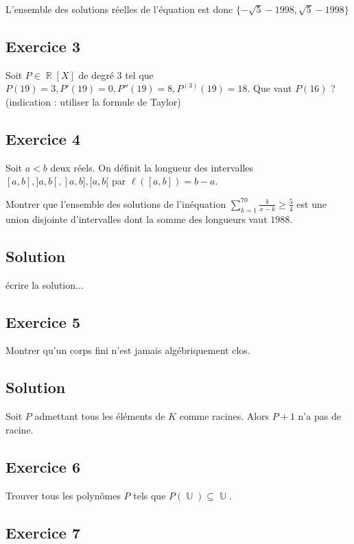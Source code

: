 \documentclass{article}
\DeclareMathOperator{\R}{\mathbb{R}}
\DeclareMathOperator{\U}{\mathbb{U}}
\begin{document}
L'ensemble des solutions réelles de l'équation est donc $\{ -\sqrt{5} - 1998, \sqrt{5}-1998 \}$ 

\subsection*{Exercice 3} 

Soit $P \in \R[X]$ de degré $3$ tel que $P(19) = 3, P'(19) = 0, P''(19) = 8, P^{(3)}(19) = 18$. Que vaut $P(16)$ ? (indication : utiliser la formule de Taylor) 

\subsection*{Exercice 4} 

Soit $a < b$ deux réels. On définit la longueur des intervalles $[a, b], ]a,b[, ]a, b], [a, b[$ par $\ell([a, b]) = b-a$. 

Montrer que l'ensemble des solutions de l'inéquation $\displaystyle\sum_{k=1}^{70}{\frac{k}{x-k}} \geqslant \frac{5}{4}$ est une union disjointe d'intervalles dont la somme des longueurs vaut $1988$. 

\subsection*{Solution} 

écrire la solution... 

\subsection*{Exercice 5} 

Montrer qu'un corps fini n'est jamais algébriquement clos. 

\subsection*{Solution} 

Soit $P$ admettant tous les éléments de $K$ comme racines. Alors $P+1$ n'a pas de racine. 

\subsection*{Exercice 6} 

Trouver tous les polynômes $P$ tels que $P(\U) \subseteq \U$. 

\subsection*{Exercice 7} 
\end{document}

